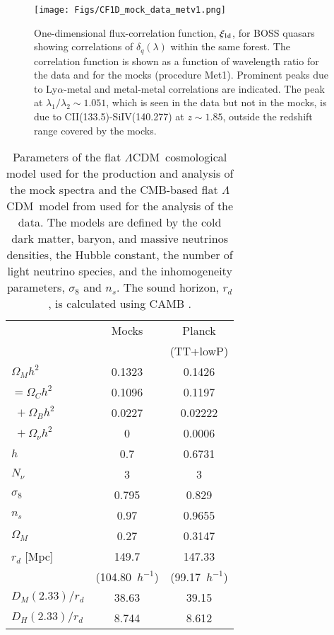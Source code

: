 \documentclass{aa}
\newcommand{\xionedim}{\xi_{\rm 1d}}
\newcommand{\dqlam}{\delta_q(\lambda)}
\newcommand{\lya}{Ly$\alpha$}
\newcommand{\om}{\Omega_M}
\newcommand{\oc}{\Omega_C}
\newcommand{\ob}{\Omega_B}
\newcommand{\on}{\Omega_\nu}
\newcommand{\DM}{D_M}
\newcommand{\DHub}{D_H}
\newcommand{\lcdm}{$\Lambda$CDM~}
\begin{document}
\begin{figure}[htbp]
\begin{center}
\texttt{[image: Figs/CF1D\_mock\_data\_metv1.png]}
\caption{
  One-dimensional flux-correlation function, $\xionedim$,
  for BOSS quasars showing
correlations of $\dqlam$ within the same forest.
The correlation function is shown as a function of wavelength
ratio for the data and for the mocks (procedure Met1).
Prominent peaks due to \lya-metal and metal-metal correlations
are indicated.
The peak at $\lambda_1/\lambda_2\sim1.051$, which is seen in the
data but not in the mocks, is due to  CII(133.5)-SiIV(140.277)
  at $z\sim1.85$, outside the redshift range covered by the mocks.
}
\label{fig:xi1d}
\end{center}
\end{figure}
	
\begin{table}
  \centering
\caption{Parameters of the flat \lcdm cosmological model used
for the production and analysis of the mock spectra and
the CMB-based flat \lcdm model from \citet{2016A&A...594A..13P}
used for the analysis of the data.
The models are defined by the cold dark matter, baryon, and massive
neutrinos densities, the Hubble constant, the number of light
neutrino species, and the inhomogeneity parameters, $\sigma_8$ and $n_s$.
The sound horizon, $r_d$, is calculated using
CAMB \citep{2000ApJ...538..473L}.
} 
\label{modtable}
\begin{tabular}{l c c }
 & Mocks & Planck    \\
  &          &  (TT+lowP)    \\
\hline \hline
\noalign{\smallskip}
$\om h^2$  & 0.1323 & 0.1426  \\
$=\oc h^2$   & 0.1096  & 0.1197  \\
$\;+\ob h^2$   & 0.0227 & 0.02222    \\
$\;+\on h^2$    & 0 & 0.0006  \\
$h $    & 0.7 & 0.6731  \\
$N_\nu$  & 3  & 3  \\
$\sigma_8$ & 0.795 & 0.829 \\
$n_s$ & 0.97  & 0.9655 \\
\hline
$\om$    &0.27  & 0.3147  \\
$r_d$ [Mpc]   & 149.7 & 147.33   \\
    & (104.80~$h^{-1}$) & (99.17~$h^{-1}$)   \\
$\DM(2.33)/r_d$   & 38.63 & 39.15  \\
$\DHub(2.33)/r_d$   & 8.744 & 8.612  \\
\end{tabular}
\end{table}
\end{document}
